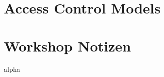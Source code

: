 \documentclass[a4paper]{report}
\begin{document}


\tableofcontents
\newpage

\chapter{Access Control Models}



\chapter{Workshop Notizen}


\listoffigures
\printglossary[style=altlist,title=Glossar]

 {alpha}

\end{document}
